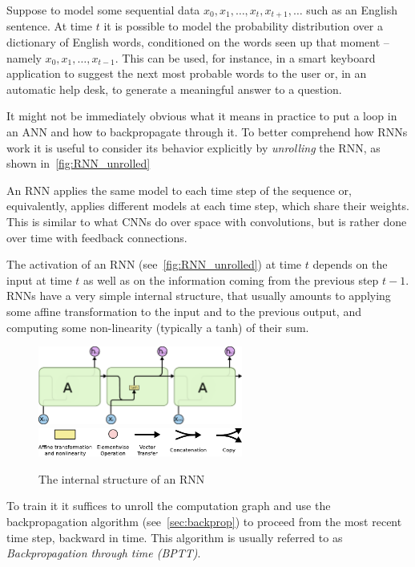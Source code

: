 Suppose to model some sequential data $x_0, x_1, \dots , x_t, x_{t+1}, \dots$
such as an English sentence. At time $t$ it is possible to model the
probability distribution over a dictionary of English words, conditioned on the
words seen up that moment -- namely $x_0, x_1, \dots , x_{t-1}$. This can be
used, for instance, in a smart keyboard application to suggest the next most
probable words to the user or, in an automatic help desk, to generate a
meaningful answer to a question.

It might not be immediately obvious what it means in practice to put a loop in
an ANN and how to backpropagate through it. To better comprehend how RNNs work
it is useful to consider its behavior explicitly by \emph{unrolling} the RNN,
as shown in~\autoref{fig:RNN_unrolled}

\noindent An RNN applies the same model to each time step of the sequence or,
equivalently, applies different models at each time step, which share their
weights. This is similar to what CNNs do over space with convolutions, but is
rather done over time with feedback connections.

The activation of an RNN (see~\autoref{fig:RNN_unrolled}) at time $t$ depends
on the input at time $t$ as well as on the information coming from the previous
step $t-1$. RNNs have a very simple internal structure, that usually amounts to
applying some affine transformation to the input and to the previous output,
and computing some non-linearity (typically a tanh) of their sum.

\begin{figure}[t]
    \centering
    \includegraphics[width=0.6\textwidth]{pdf/RNN_internals.pdf}
    \includegraphics[width=0.6\textwidth]{pdf/LSTM_notation.pdf}
    \caption{The internal structure of an RNN\label{fig:RNN_internals}}
\end{figure}

To train it it suffices to unroll the computation graph and use the
backpropagation algorithm (see~\autoref{sec:backprop}) to proceed from the most
recent time step, backward in time. This algorithm is usually referred to as
\emph{Backpropagation through time (BPTT)}.


